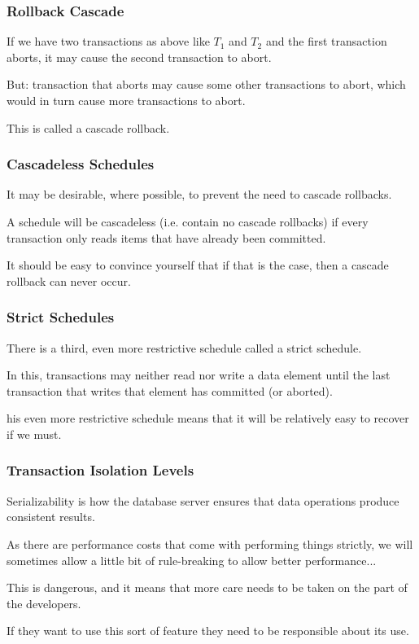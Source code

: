 \begin{frame}
\frametitle{Rollback Cascade}

If we have two transactions as above like $T_{1}$ and $T_{2}$ and the first transaction aborts, it may cause the second transaction to abort. 

But: transaction that aborts may cause some other transactions to abort, which would in turn cause more transactions to abort.

 This is called a cascade rollback.

\end{frame}

\begin{frame}
\frametitle{Cascadeless Schedules}

It may be desirable, where possible, to prevent the need to cascade rollbacks. 

A schedule will be \alert{cascadeless} (i.e. contain no cascade rollbacks) if every transaction only reads items that have already been committed. 

It should be easy to convince yourself that if that is the case, then a cascade rollback can never occur. 


\end{frame}

\begin{frame}
\frametitle{Strict Schedules}

There is a third, even more restrictive schedule called a \alert{strict schedule}.

In this, transactions may neither read nor write a data element until the last transaction that writes that element has committed (or aborted).

his even more restrictive schedule means that it will be relatively easy to recover if we must.

\end{frame}

\begin{frame}
\frametitle{Transaction Isolation Levels}

Serializability is how the database server ensures that data operations produce consistent results. 

As there are performance costs that come with performing things strictly, we will sometimes allow a little bit of rule-breaking to allow better performance... 

This is dangerous, and it means that more care needs to be taken on the part of the developers. 

If they want to use this sort of feature they need to be responsible about its use.


\end{frame}

